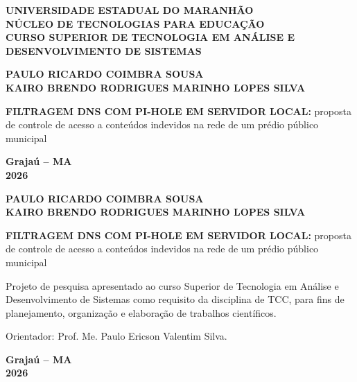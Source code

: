 \documentclass[12pt,a4paper]{article}
\begin{document}
\begin{titlepage}
\centering\singlespacing
\textbf{UNIVERSIDADE ESTADUAL DO MARANHÃO}\\
\textbf{NÚCLEO DE TECNOLOGIAS PARA EDUCAÇÃO}\\
\textbf{CURSO SUPERIOR DE TECNOLOGIA EM ANÁLISE E DESENVOLVIMENTO DE SISTEMAS}\par
\vspace{3.2cm}
\textbf{PAULO RICARDO COIMBRA SOUSA \\ KAIRO BRENDO RODRIGUES MARINHO LOPES SILVA}\par
\vspace{3.2cm}
\textbf{FILTRAGEM DNS COM PI-HOLE EM SERVIDOR LOCAL:} proposta de controle de acesso a conteúdos indevidos na rede de um prédio público municipal\par
\vfill
\textbf{Grajaú – MA}\\
\textbf{2026}
\end{titlepage}
\setcounter{page}{1}

\begin{titlepage}
\centering\singlespacing
\textbf{PAULO RICARDO COIMBRA SOUSA \\ KAIRO BRENDO RODRIGUES MARINHO LOPES SILVA}\par
\vspace{3.6cm}
\textbf{FILTRAGEM DNS COM PI-HOLE EM SERVIDOR LOCAL:} proposta de controle de acesso a conteúdos indevidos na rede de um prédio público municipal\par
\vspace{1.2cm}
\hfill\begin{minipage}{8cm}\raggedright\singlespacing
Projeto de pesquisa apresentado ao curso Superior de Tecnologia em Análise e Desenvolvimento de Sistemas como requisito da disciplina de TCC, para fins de planejamento, organização e elaboração de trabalhos científicos.\par\vspace{12pt}
Orientador: Prof. Me. Paulo Ericson Valentim Silva.
\end{minipage}
\vfill
\textbf{Grajaú – MA}\\
\textbf{2026}
\end{titlepage}

\clearpage
\singlespacing\tableofcontents\onehalfspacing

\clearpage\pagestyle{texto}
\end{document}
